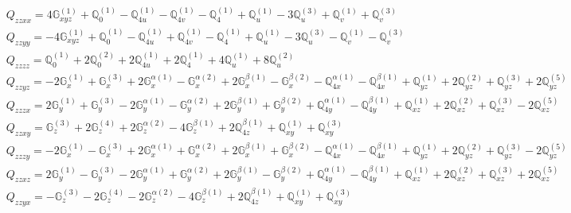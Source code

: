 \documentclass[fleqn,8pt,landscape]{jsarticle}
\begin{document}
\begin{align*}
& Q_{zzxx} = 4 \mathbb{G}_{xyz}^{(1)} + \mathbb{Q}_{0}^{(1)} - \mathbb{Q}_{4u}^{(1)} - \mathbb{Q}_{4v}^{(1)} - \mathbb{Q}_{4}^{(1)} + \mathbb{Q}_{u}^{(1)} - 3 \mathbb{Q}_{u}^{(3)} + \mathbb{Q}_{v}^{(1)} + \mathbb{Q}_{v}^{(3)} \\
& Q_{zzyy} = - 4 \mathbb{G}_{xyz}^{(1)} + \mathbb{Q}_{0}^{(1)} - \mathbb{Q}_{4u}^{(1)} + \mathbb{Q}_{4v}^{(1)} - \mathbb{Q}_{4}^{(1)} + \mathbb{Q}_{u}^{(1)} - 3 \mathbb{Q}_{u}^{(3)} - \mathbb{Q}_{v}^{(1)} - \mathbb{Q}_{v}^{(3)} \\
& Q_{zzzz} = \mathbb{Q}_{0}^{(1)} + 2 \mathbb{Q}_{0}^{(2)} + 2 \mathbb{Q}_{4u}^{(1)} + 2 \mathbb{Q}_{4}^{(1)} + 4 \mathbb{Q}_{u}^{(1)} + 8 \mathbb{Q}_{u}^{(2)} \\
& Q_{zzyz} = - 2 \mathbb{G}_{x}^{(1)} + \mathbb{G}_{x}^{(3)} + 2 \mathbb{G}_{x}^{\alpha(1)} - \mathbb{G}_{x}^{\alpha(2)} + 2 \mathbb{G}_{x}^{\beta(1)} - \mathbb{G}_{x}^{\beta(2)} - \mathbb{Q}_{4x}^{\alpha(1)} - \mathbb{Q}_{4x}^{\beta(1)} + \mathbb{Q}_{yz}^{(1)} + 2 \mathbb{Q}_{yz}^{(2)} + \mathbb{Q}_{yz}^{(3)} + 2 \mathbb{Q}_{yz}^{(5)} \\
& Q_{zzzx} = 2 \mathbb{G}_{y}^{(1)} + \mathbb{G}_{y}^{(3)} - 2 \mathbb{G}_{y}^{\alpha(1)} - \mathbb{G}_{y}^{\alpha(2)} + 2 \mathbb{G}_{y}^{\beta(1)} + \mathbb{G}_{y}^{\beta(2)} + \mathbb{Q}_{4y}^{\alpha(1)} - \mathbb{Q}_{4y}^{\beta(1)} + \mathbb{Q}_{xz}^{(1)} + 2 \mathbb{Q}_{xz}^{(2)} + \mathbb{Q}_{xz}^{(3)} - 2 \mathbb{Q}_{xz}^{(5)} \\
& Q_{zzxy} = \mathbb{G}_{z}^{(3)} + 2 \mathbb{G}_{z}^{(4)} + 2 \mathbb{G}_{z}^{\alpha(2)} - 4 \mathbb{G}_{z}^{\beta(1)} + 2 \mathbb{Q}_{4z}^{\beta(1)} + \mathbb{Q}_{xy}^{(1)} + \mathbb{Q}_{xy}^{(3)} \\
& Q_{zzzy} = - 2 \mathbb{G}_{x}^{(1)} - \mathbb{G}_{x}^{(3)} + 2 \mathbb{G}_{x}^{\alpha(1)} + \mathbb{G}_{x}^{\alpha(2)} + 2 \mathbb{G}_{x}^{\beta(1)} + \mathbb{G}_{x}^{\beta(2)} - \mathbb{Q}_{4x}^{\alpha(1)} - \mathbb{Q}_{4x}^{\beta(1)} + \mathbb{Q}_{yz}^{(1)} + 2 \mathbb{Q}_{yz}^{(2)} + \mathbb{Q}_{yz}^{(3)} - 2 \mathbb{Q}_{yz}^{(5)} \\
& Q_{zzxz} = 2 \mathbb{G}_{y}^{(1)} - \mathbb{G}_{y}^{(3)} - 2 \mathbb{G}_{y}^{\alpha(1)} + \mathbb{G}_{y}^{\alpha(2)} + 2 \mathbb{G}_{y}^{\beta(1)} - \mathbb{G}_{y}^{\beta(2)} + \mathbb{Q}_{4y}^{\alpha(1)} - \mathbb{Q}_{4y}^{\beta(1)} + \mathbb{Q}_{xz}^{(1)} + 2 \mathbb{Q}_{xz}^{(2)} + \mathbb{Q}_{xz}^{(3)} + 2 \mathbb{Q}_{xz}^{(5)} \\
& Q_{zzyx} = - \mathbb{G}_{z}^{(3)} - 2 \mathbb{G}_{z}^{(4)} - 2 \mathbb{G}_{z}^{\alpha(2)} - 4 \mathbb{G}_{z}^{\beta(1)} + 2 \mathbb{Q}_{4z}^{\beta(1)} + \mathbb{Q}_{xy}^{(1)} + \mathbb{Q}_{xy}^{(3)} \\

\end{align*}
\end{document}
